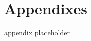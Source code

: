 \documentclass[%
 reprint,
 amsmath,amssymb,
 aps,
]{revtex4-2}
\begin{document}



\appendix

\section{Appendixes}

appendix placeholder



\end{document}
